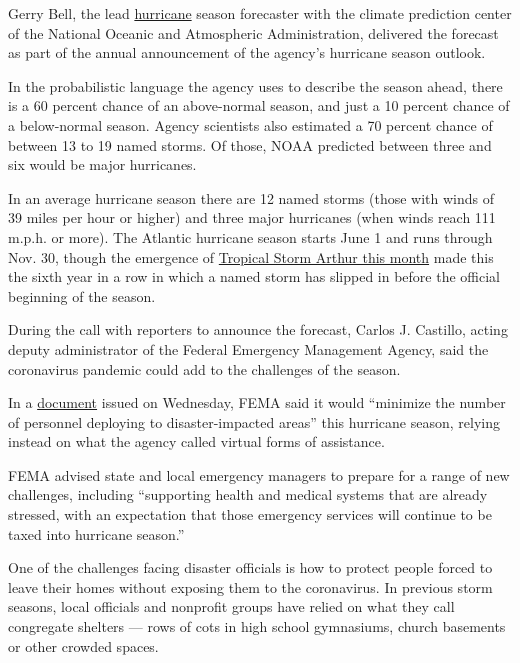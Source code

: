 Gerry Bell, the lead
\href{https://www.nytimes.com/2020/07/09/climate/trump-hurricane-dorian-noaa.html}{hurricane}
season forecaster with the climate prediction center of the National
Oceanic and Atmospheric Administration, delivered the forecast as part
of the annual announcement of the agency's hurricane season outlook.

In the probabilistic language the agency uses to describe the season
ahead, there is a 60 percent chance of an above-normal season, and just
a 10 percent chance of a below-normal season. Agency scientists also
estimated a 70 percent chance of between 13 to 19 named storms. Of
those, NOAA predicted between three and six would be major hurricanes.

In an average hurricane season there are 12 named storms (those with
winds of 39 miles per hour or higher) and three major hurricanes (when
winds reach 111 m.p.h. or more). The Atlantic hurricane season starts
June 1 and runs through Nov. 30, though the emergence of
\href{https://www.nytimes.com/2020/05/17/us/tropical-storm-arthur-2020-path.html}{Tropical
Storm Arthur this month} made this the sixth year in a row in which a
named storm has slipped in before the official beginning of the season.

During the call with reporters to announce the forecast, Carlos J.
Castillo, acting deputy administrator of the Federal Emergency
Management Agency, said the coronavirus pandemic could add to the
challenges of the season.

In a
\href{https://www.fema.gov/media-library-data/1589997234798-adb5ce5cb98a7a89e3e1800becf0eb65/2020_Hurricane_Pandemic_Plan.pdf}{document}
issued on Wednesday, FEMA said it would ``minimize the number of
personnel deploying to disaster-impacted areas'' this hurricane season,
relying instead on what the agency called virtual forms of assistance.

FEMA advised state and local emergency managers to prepare for a range
of new challenges, including ``supporting health and medical systems
that are already stressed, with an expectation that those emergency
services will continue to be taxed into hurricane season.''

One of the challenges facing disaster officials is how to protect people
forced to leave their homes without exposing them to the coronavirus. In
previous storm seasons, local officials and nonprofit groups have relied
on what they call congregate shelters --- rows of cots in high school
gymnasiums, church basements or other crowded spaces.

